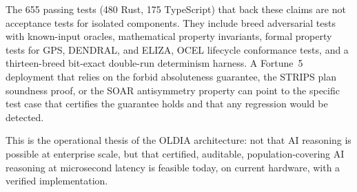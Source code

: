 The 655 passing tests (480 Rust, 175 TypeScript) that back these claims are not
acceptance tests for isolated components. They include breed adversarial tests
with known-input oracles, mathematical property invariants, formal property tests
for GPS, DENDRAL, and ELIZA, OCEL lifecycle conformance tests, and a
thirteen-breed bit-exact double-run determinism harness. A Fortune~5 deployment
that relies on the forbid absoluteness guarantee, the STRIPS plan soundness proof,
or the SOAR antisymmetry property can point to the specific test case that
certifies the guarantee holds and that any regression would be detected.

This is the operational thesis of the OLDIA architecture: not that AI reasoning
is possible at enterprise scale, but that certified, auditable, population-covering
AI reasoning at microsecond latency is feasible today, on current hardware, with
a verified implementation.
